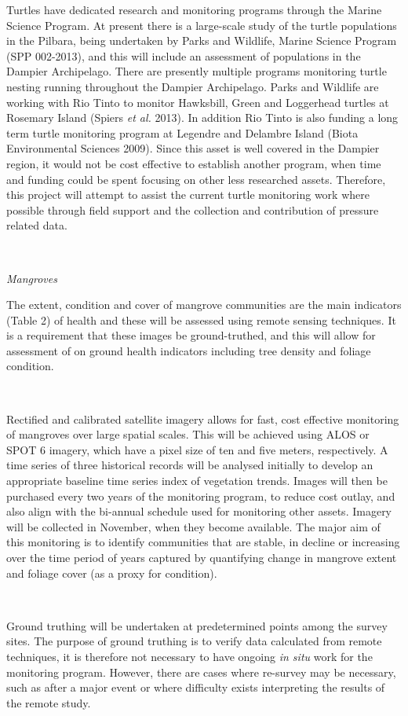 \documentclass[version=last,
    paper=a4,                               %
    10pt,                                   %
    dvipsnames,
    oneside,                              %
    headings=openany,                       %
    open=any,
    BCOR=7mm,                               %
    DIV=15,     %
]{scrbook}
\begin{document}
Turtles have dedicated research and monitoring programs through the
Marine Science Program. At present there is a large-scale study of the
turtle populations in the Pilbara, being undertaken by Parks and
Wildlife, Marine Science Program (SPP 002-2013), and this will include
an assessment of populations in the Dampier Archipelago. There are
presently multiple programs monitoring turtle nesting running throughout
the Dampier Archipelago. Parks and Wildlife are working with Rio Tinto
to monitor Hawksbill, Green and Loggerhead turtles at Rosemary Island
(Spiers \emph{et al.} 2013). In addition Rio Tinto is also funding a
long term turtle monitoring program at Legendre and Delambre Island
(Biota Environmental Sciences 2009). Since this asset is well covered in
the Dampier region, it would not be cost effective to establish another
program, when time and funding could be spent focusing on other less
researched assets. Therefore, this project will attempt to assist the
current turtle monitoring work where possible through field support and
the collection and contribution of pressure related data.

~

\emph{Mangroves}

The extent, condition and cover of mangrove communities are the main
indicators (Table 2) of health and these will be assessed using remote
sensing techniques. It is a requirement that these images be
ground-truthed, and this will allow for assessment of on ground health
indicators including tree density and foliage condition.

~

Rectified and calibrated satellite imagery allows for fast, cost
effective monitoring of mangroves over large spatial scales. This will
be achieved using ALOS or SPOT 6 imagery, which have a pixel size of ten
and five meters, respectively. A time series of three historical records
will be analysed initially to develop an appropriate baseline time
series index of vegetation trends. Images will then be purchased every
two years of the monitoring program, to reduce cost outlay, and also
align with the bi-annual schedule used for monitoring other assets.
Imagery will be collected in November, when they become available. The
major aim of this monitoring is to identify communities that are stable,
in decline or increasing over the time period of years captured by
quantifying change in mangrove extent and foliage cover (as a proxy for
condition).

~

Ground truthing will be undertaken at predetermined points among the
survey sites. The purpose of ground truthing is to verify data
calculated from remote techniques, it is therefore not necessary to have
ongoing \emph{in situ} work for the monitoring program. However, there
are cases where re-survey may be necessary, such as after a major event
or where difficulty exists interpreting the results of the remote study.
\end{document}
